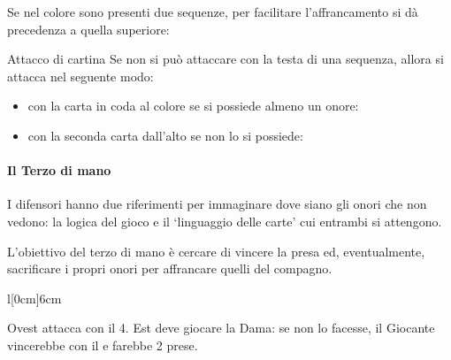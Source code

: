 \documentclass[../corsofiori.tex]{subfiles}
\begin{document}
Se nel colore sono presenti due sequenze, per facilitare l'affrancamento si dà precedenza a quella superiore:

\qquad{}

\medskip
\begin{regola}{Attacco di cartina}
    Se non si può attaccare con la testa di una sequenza, allora si attacca nel seguente modo:
\begin{itemize}
    \item con la carta in coda al colore se si possiede almeno un onore:

        \qquad
        \qquad

    \item con la seconda carta dall'alto se non lo si possiede:

        \qquad
\end{itemize}
\end{regola}

\paragraph{Il Terzo di mano} I difensori hanno due riferimenti per immaginare dove siano gli onori che non vedono: la
logica del gioco e il `linguaggio delle carte' cui entrambi si attengono.

L'obiettivo del terzo di mano è cercare di vincere la presa ed, eventualmente, sacrificare i propri onori per affrancare
quelli del compagno. 

\begin{wraptable}[6]{l}[0cm]{6cm}

    \vspace{-.5cm}

    \hspace{1cm}

    \bigskip

    \hspace{1.375cm}
\end{wraptable}
\bigskip

Ovest attacca con il 4. Est deve giocare la Dama: se non lo facesse, il Giocante vincerebbe con il \Ten e farebbe 2
prese.
\vspace{.7cm}
\end{document}
